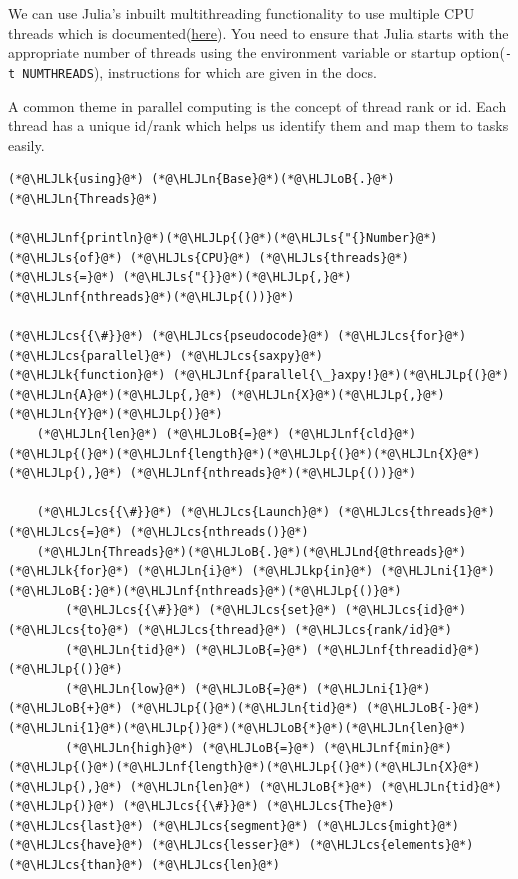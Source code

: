 \documentclass[12pt,a4paper]{article}
\newcommand{\HLJLk}[1]{\textcolor[RGB]{148,91,176}{\textbf{#1}}}
\newcommand{\HLJLkp}[1]{\textcolor[RGB]{148,91,176}{\textbf{#1}}}
\newcommand{\HLJLn}[1]{#1}
\newcommand{\HLJLnd}[1]{\textcolor[RGB]{214,102,97}{#1}}
\newcommand{\HLJLnf}[1]{\textcolor[RGB]{66,102,213}{#1}}
\newcommand{\HLJLs}[1]{\textcolor[RGB]{201,61,57}{#1}}
\newcommand{\HLJLni}[1]{\textcolor[RGB]{59,151,46}{#1}}
\newcommand{\HLJLoB}[1]{\textcolor[RGB]{102,102,102}{\textbf{#1}}}
\newcommand{\HLJLp}[1]{#1}
\newcommand{\HLJLcs}[1]{\textcolor[RGB]{153,153,119}{\textit{#1}}}
\begin{document}
We can use Julia's inbuilt multithreading functionality to use multiple CPU threads which is documented(\href{https://docs.julialang.org/en/v1/manual/multi-threading/}{here}). You need to ensure that Julia starts with the appropriate number of threads using the environment variable or startup option(\texttt{-t NUMTHREADS}), instructions for which are given in the docs.

A common theme in parallel computing is the concept of thread rank or id. Each thread has a unique id/rank which helps us identify them and map them to tasks easily.


\begin{lstlisting}
(*@\HLJLk{using}@*) (*@\HLJLn{Base}@*)(*@\HLJLoB{.}@*)(*@\HLJLn{Threads}@*)

(*@\HLJLnf{println}@*)(*@\HLJLp{(}@*)(*@\HLJLs{"{}Number}@*) (*@\HLJLs{of}@*) (*@\HLJLs{CPU}@*) (*@\HLJLs{threads}@*) (*@\HLJLs{=}@*) (*@\HLJLs{"{}}@*)(*@\HLJLp{,}@*) (*@\HLJLnf{nthreads}@*)(*@\HLJLp{())}@*)

(*@\HLJLcs{{\#}}@*) (*@\HLJLcs{pseudocode}@*) (*@\HLJLcs{for}@*) (*@\HLJLcs{parallel}@*) (*@\HLJLcs{saxpy}@*)
(*@\HLJLk{function}@*) (*@\HLJLnf{parallel{\_}axpy!}@*)(*@\HLJLp{(}@*)(*@\HLJLn{A}@*)(*@\HLJLp{,}@*) (*@\HLJLn{X}@*)(*@\HLJLp{,}@*) (*@\HLJLn{Y}@*)(*@\HLJLp{)}@*)
    (*@\HLJLn{len}@*) (*@\HLJLoB{=}@*) (*@\HLJLnf{cld}@*)(*@\HLJLp{(}@*)(*@\HLJLnf{length}@*)(*@\HLJLp{(}@*)(*@\HLJLn{X}@*)(*@\HLJLp{),}@*) (*@\HLJLnf{nthreads}@*)(*@\HLJLp{())}@*)

    (*@\HLJLcs{{\#}}@*) (*@\HLJLcs{Launch}@*) (*@\HLJLcs{threads}@*) (*@\HLJLcs{=}@*) (*@\HLJLcs{nthreads()}@*)
    (*@\HLJLn{Threads}@*)(*@\HLJLoB{.}@*)(*@\HLJLnd{@threads}@*) (*@\HLJLk{for}@*) (*@\HLJLn{i}@*) (*@\HLJLkp{in}@*) (*@\HLJLni{1}@*)(*@\HLJLoB{:}@*)(*@\HLJLnf{nthreads}@*)(*@\HLJLp{()}@*)
        (*@\HLJLcs{{\#}}@*) (*@\HLJLcs{set}@*) (*@\HLJLcs{id}@*) (*@\HLJLcs{to}@*) (*@\HLJLcs{thread}@*) (*@\HLJLcs{rank/id}@*)
        (*@\HLJLn{tid}@*) (*@\HLJLoB{=}@*) (*@\HLJLnf{threadid}@*)(*@\HLJLp{()}@*)
        (*@\HLJLn{low}@*) (*@\HLJLoB{=}@*) (*@\HLJLni{1}@*) (*@\HLJLoB{+}@*) (*@\HLJLp{(}@*)(*@\HLJLn{tid}@*) (*@\HLJLoB{-}@*) (*@\HLJLni{1}@*)(*@\HLJLp{)}@*)(*@\HLJLoB{*}@*)(*@\HLJLn{len}@*)
        (*@\HLJLn{high}@*) (*@\HLJLoB{=}@*) (*@\HLJLnf{min}@*)(*@\HLJLp{(}@*)(*@\HLJLnf{length}@*)(*@\HLJLp{(}@*)(*@\HLJLn{X}@*)(*@\HLJLp{),}@*) (*@\HLJLn{len}@*) (*@\HLJLoB{*}@*) (*@\HLJLn{tid}@*)(*@\HLJLp{)}@*) (*@\HLJLcs{{\#}}@*) (*@\HLJLcs{The}@*) (*@\HLJLcs{last}@*) (*@\HLJLcs{segment}@*) (*@\HLJLcs{might}@*) (*@\HLJLcs{have}@*) (*@\HLJLcs{lesser}@*) (*@\HLJLcs{elements}@*) (*@\HLJLcs{than}@*) (*@\HLJLcs{len}@*)


\end{lstlisting}
\end{document}
